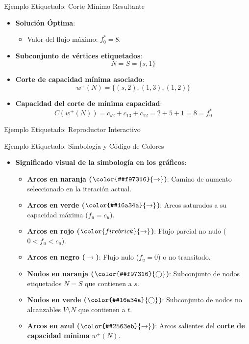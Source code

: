\documentclass[
  ignorenonframetext,
]{beamer}
\providecommand{\tightlist}{%
  \setlength{\itemsep}{0pt}\setlength{\parskip}{0pt}}
\begin{document}
\begin{frame}{Ejemplo Etiquetado: Corte Mínimo Resultante}
\label{ejemplo-etiquetado-corte-muxednimo-resultante}
\begin{itemize}
\item
  \textbf{Solución Óptima}:

  \begin{itemize}
  \tightlist
  \item
    Valor del flujo máximo: \(f_0^* = 8\).
  \end{itemize}
\item
  \textbf{Subconjunto de vértices etiquetados}: \[N = S = \{s, 1\}\]
\item
  \textbf{Corte de capacidad mínima asociado}:
  \[w^+(N) = \{(s, 2), (1, 3), (1, 2)\}\]
\item
  \textbf{Capacidad del corte de mínima capacidad}:
  \[C(w^+(N)) = c_{s2} + c_{13} + c_{12} = 2 + 5 + 1 = 8 = f_0^*\]
\end{itemize}
\end{frame}

\begin{frame}{Ejemplo Etiquetado: Reproductor Interactivo}
\label{ejemplo-etiquetado-reproductor-interactivo}
\end{frame}

\begin{frame}{Ejemplo Etiquetado: Simbología y Código de Colores}
\label{ejemplo-etiquetado-simbologuxeda-y-cuxf3digo-de-colores}
\begin{itemize}
\tightlist
\item
  \textbf{Significado visual de la simbología en los gráficos}:

  \begin{itemize}
  \tightlist
  \item
    \textbf{Arcos en naranja (\(\color{#f97316}{\rightarrow}\))}: Camino
    de aumento seleccionado en la iteración actual.
  \item
    \textbf{Arcos en verde (\(\color{#16a34a}{\rightarrow}\))}: Arcos
    saturados a su capacidad máxima (\(f_u = c_u\)).
  \item
    \textbf{Arcos en rojo (\(\color{firebrick}{\rightarrow}\))}: Flujo
    parcial no nulo (\(0 < f_u < c_u\)).
  \item
    \textbf{Arcos en negro (\(\rightarrow\))}: Flujo nulo (\(f_u = 0\))
    o no transitado.
  \item
    \textbf{Nodos en naranja (\(\color{#f97316}{\bigcirc}\))}:
    Subconjunto de nodos etiquetados \(N = S\) que contienen a \(s\).
  \item
    \textbf{Nodos en verde (\(\color{#16a34a}{\bigcirc}\))}: Subconjunto
    de nodos no alcanzables \(V \setminus N\) que contienen a \(t\).
  \item
    \textbf{Arcos en azul (\(\color{#2563eb}{\rightarrow}\))}: Arcos
    salientes del \textbf{corte de capacidad mínima} \(w^+(N)\).
  \end{itemize}
\end{itemize}
\end{frame}
\end{document}
